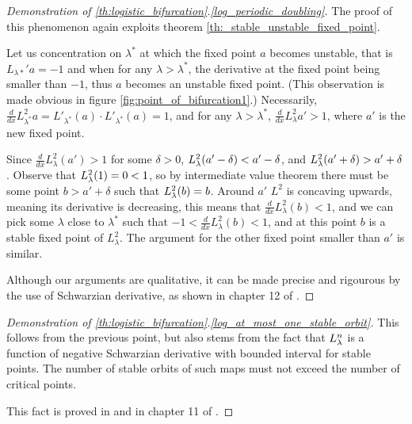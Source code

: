 \begin{proof}[Demonstration of \ref{th:logistic_bifurcation}.\ref{log_periodic_doubling}]
	The proof of this phenomenon again exploits theorem \ref{th:_stable_unstable_fixed_point}.

	Let us concentration on $\lambda^*$ at which the fixed point $a$ becomes unstable, that is $L_{\lambda*}' a  = - 1$ and when for any $\lambda > \lambda^*$, the derivative at the fixed point being smaller than $-1$, thus $a$ becomes an unstable fixed point. (This observation is made obvious in figure \ref{fig:point_of_bifurcation1}.)
	Necessarily, $\frac{d}{dx}L_{\lambda^*}^2 a = L'_{\lambda^*}(a) \cdot L'_{\lambda^*}(a) = 1$,
	and for any $\lambda > \lambda^*$, $\frac{d}{dx}L_{\lambda}^2a'> 1$, where $a'$ is the new fixed point.

	Since $\frac{d}{dx}L_{\lambda}^2(a') > 1$ for some $\delta > 0$, $L_{\lambda}^2(a' - \delta) < a' - \delta$, and $L_{\lambda}^2(a' + \delta) > a' + \delta$. 
	Observe that $L_{\lambda}^2(1) = 0 < 1$, so by intermediate value theorem there must be some point $b > a' + \delta$ such that $L_{\lambda}^2(b) = b$. 
	Around $a'$ $L^2$ is concaving upwards, meaning its derivative is decreasing, this means that $\frac{d}{dx }L_{\lambda}^2(b) < 1$,
	and we can pick some $\lambda$  close to $\lambda ^*$ such that $-1<\frac{d}{dx }L_{\lambda}^2(b) < 1$, and at this point $b$ is a stable fixed point of $L_{\lambda}^2$.
	The argument for the other fixed point smaller than $a'$ is similar. 

	Although our arguments are qualitative, it can be made precise and rigourous by the use of Schwarzian derivative, as shown in chapter 12 of \cite{Devaney_green_book_chaos_definition}.
\end{proof}

\begin{proof}[Demonstration of \ref{th:logistic_bifurcation}.\ref{log_at_most_one_stable_orbit}]
	This follows from the previous point, but also stems from the fact that $L_{\lambda}^n$ is a function of negative Schwarzian derivative with bounded interval for stable points.
	The number of stable orbits of such maps must not exceed the number of critical points.

	This fact is proved in \cite{Pierre_Collet} and in chapter 11 of \cite{Devaney_green_book_chaos_definition}.
\end{proof}

